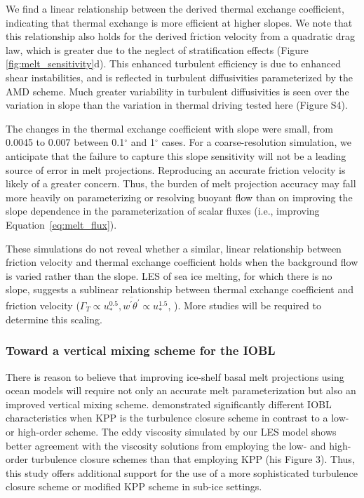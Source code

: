\documentclass[draft]{agujournal2019}
\begin{document}
We find a linear relationship between the derived thermal exchange coefficient, indicating that thermal exchange is more efficient at higher slopes. We note that this relationship also holds for the derived friction velocity from a quadratic drag law, which is greater due to the neglect of stratification effects (Figure \ref{fig:melt_sensitivity}d). This enhanced turbulent efficiency is due to enhanced shear instabilities, and is reflected in turbulent diffusivities parameterized by the AMD scheme. Much greater variability in turbulent diffusivities is seen over the variation in slope than the variation in thermal driving tested here (Figure S4). 

The changes in the thermal exchange coefficient with slope were small, from 0.0045 to 0.007 between 0.1$^{\circ}$ and 1$^{\circ}$ cases. For a coarse-resolution simulation, we anticipate that the failure to capture this slope sensitivity will not be a leading source of error in melt projections. Reproducing an accurate friction velocity is likely of a greater concern. Thus, the burden of melt projection accuracy may fall more heavily on parameterizing or resolving buoyant flow than on improving the slope dependence in the parameterization of scalar fluxes (i.e., improving Equation~\ref{eq:melt_flux}). 

These simulations do not reveal whether a similar, linear relationship between friction velocity and thermal exchange coefficient holds when the background flow is varied rather than the slope. LES of sea ice melting, for which there is no slope, suggests a sublinear relationship between thermal exchange coefficient and friction velocity ($\Gamma_T \propto u_*^{0.5}, \overline{w^\prime \theta^\prime} \propto u_*^{1.5}$, ). More studies will be required to determine this scaling. 


\subsubsection{Toward a vertical mixing scheme for the IOBL}\label{disc:prm_vmix}

There is reason to believe that improving ice-shelf basal melt projections using ocean models will require not only an accurate melt parameterization but also an improved vertical mixing scheme.  demonstrated significantly different IOBL characteristics when KPP is the turbulence closure scheme in contrast to a low- or high-order scheme. The eddy viscosity simulated by our LES model shows better agreement with the viscosity solutions from  employing the low- and high-order turbulence closure schemes than that employing KPP (his Figure 3). Thus, this study offers additional support for the use of a more sophisticated turbulence closure scheme or modified KPP scheme in sub-ice settings.
\end{document}
